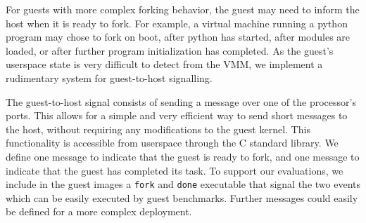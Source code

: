 For guests with more complex forking behavior, the guest may need to inform the
host when it is ready to fork. For example, a virtual machine running a python
program may chose to fork on boot, after python has started, after modules are
loaded, or after further program initialization has completed. As the guest's
userspace state is very difficult to detect from the VMM, we implement a
rudimentary system for guest-to-host signalling.

The guest-to-host signal consists of sending a message over one of the
processor's ports. This allows for a simple and very efficient way to send
short messages to the host, without requiring any modifications to the guest
kernel. This functionality is accessible from userspace through the C standard
library. We define one message to indicate that the guest is ready to fork, and
one message to indicate that the guest has completed its task. To support our
evaluations, we include in the guest images a \texttt{fork} and \texttt{done}
executable that signal the two events which can be easily executed by guest
benchmarks. Further messages could easily be defined for a more complex
deployment.
